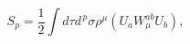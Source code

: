 \begin{equation}\label{7}
S_p=\frac{1}{2}\int d\tau d^{\,p}\sigma \rho^\mu (U_a W_\mu^{ab} U_b),
\end{equation} 
